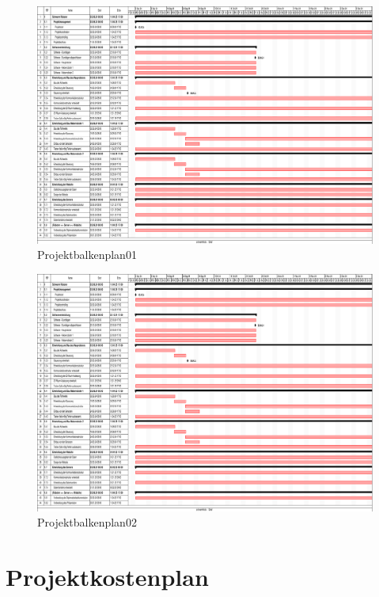 \begin{figure}[htbp]
    \centering
    \includegraphics[width=1.18\textwidth,page=1,angle=-90]{img/Projektbalkenplan-gantt_landscape.pdf}
    \caption{Projektbalkenplan01}
    \label{fig:psp_balk}
\end{figure}
\begin{figure}[htbp]
    \centering
    \includegraphics[width=1.18\textwidth,page=2,angle=-90]{img/Projektbalkenplan-gantt_landscape.pdf}
    \caption{Projektbalkenplan02}
    \label{fig:psp_balk2}
\end{figure}
\newpage

\section{Projektkostenplan}

